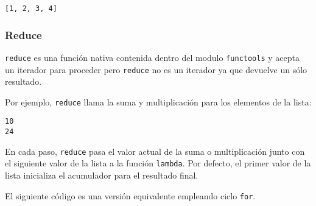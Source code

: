 \begin{verbatim}
[1, 2, 3, 4]
\end{verbatim}

\subsubsection{Reduce}

\texttt{reduce} es una función nativa contenida dentro del modulo
\texttt{functools} y acepta un iterador para proceder pero
\texttt{reduce} no es un iterador ya que devuelve un sólo resultado.

Por ejemplo, \texttt{reduce} llama la suma y multiplicación para los
elementos de la lista:

\begin{Shaded}
\begin{Highlighting}[]
 

\NormalTok{(}\NormalTok{(}\OperatorTok{+}\NormalTok{y, [}\NormalTok{,}\NormalTok{,}\NormalTok{,}\NormalTok{]))}
\NormalTok{(}\NormalTok{(}\OperatorTok{*}\NormalTok{y, [}\NormalTok{,}\NormalTok{,}\NormalTok{,}\NormalTok{]))}
\end{Highlighting}
\end{Shaded}

\begin{verbatim}
10
24
\end{verbatim}

En cada paso, \texttt{reduce} pasa el valor actual de la suma o
multiplicación junto con el siguiente valor de la lista a la función
\texttt{lambda}. Por defecto, el primer valor de la lista inicializa el
acumulador para el resultado final.

El siguiente código es una versión equivalente empleando ciclo
\texttt{for}.

\begin{Shaded}
\begin{Highlighting}[]
\OperatorTok{=}\NormalTok{ [}\NormalTok{,}\NormalTok{,}\NormalTok{,}\NormalTok{]}
\OperatorTok{=}\NormalTok{ L[}\NormalTok{]}
\NormalTok{ L[}\NormalTok{:]:}
\OperatorTok{+=}
\end{Highlighting}
\end{Shaded}

